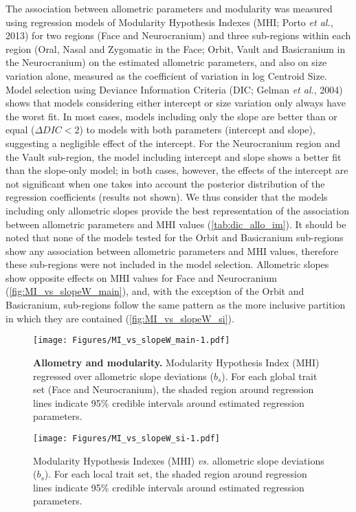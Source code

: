\documentclass[12pt,twoside]{report}
\begin{document}
The association between allometric parameters and modularity was
measured using regression models of Modularity Hypothesis Indexes (MHI;
Porto \emph{et al.}, 2013) for two regions (Face and Neurocranium) and
three sub-regions within each region (Oral, Nasal and Zygomatic in the
Face; Orbit, Vault and Basicranium in the Neurocranium) on the estimated
allometric parameters, and also on size variation alone, measured as the
coefficient of variation in log Centroid Size. Model selection using
Deviance Information Criteria (DIC; Gelman \emph{et al.}, 2004) shows
that models considering either intercept or size variation only always
have the worst fit. In most cases, models including only the slope are
better than or equal ($\Delta DIC < 2$) to models with both parameters
(intercept and slope), suggesting a negligible effect of the intercept.
For the Neurocranium region and the Vault sub-region, the model
including intercept and slope shows a better fit than the slope-only
model; in both cases, however, the effects of the intercept are not
significant when one takes into account the posterior distribution of
the regression coefficients (results not shown). We thus consider that
the models including only allometric slopes provide the best
representation of the association between allometric parameters and MHI
values (\autoref{tab:dic_allo_im}). It should be noted that none of the
models tested for the Orbit and Basicranium sub-regions show any
association between allometric parameters and MHI values, therefore
these sub-regions were not included in the model selection. Allometric
slopes show opposite effects on MHI values for Face and Neurocranium
(\autoref{fig:MI_vs_slopeW_main}), and, with the exception of the Orbit
and Basicranium, sub-regions follow the same pattern as the more
inclusive partition in which they are contained
(\autoref{fig:MI_vs_slopeW_si}).



\begin{figure}[htbp]
\centering
\texttt{[image: Figures/MI\_vs\_slopeW\_main-1.pdf]}
\caption{\textbf{Allometry and modularity.} Modularity Hypothesis Index
(MHI) regressed over allometric slope deviations ($b_s$). For each
global trait set (Face and Neurocranium), the shaded region around
regression lines indicate 95\% credible intervals around estimated
regression parameters. \label{fig:MI_vs_slopeW_main}}
\end{figure}

\begin{figure}[htbp]
\centering
\texttt{[image: Figures/MI\_vs\_slopeW\_si-1.pdf]}
\caption{Modularity Hypothesis Indexes (MHI) \emph{vs.} allometric slope
deviations ($b_s$). For each local trait set, the shaded region around
regression lines indicate 95\% credible intervals around estimated
regression parameters. \label{fig:MI_vs_slopeW_si}}
\end{figure}
\end{document}
